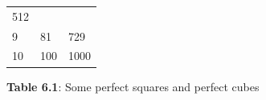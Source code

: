 {{\begin{center}
\begin{tabular}[t]{|l|l|l|}
        512%
     \tabularnewline\cline{1-1}\cline{2-2}\cline{3-3}
        9 &
        81 &
        729%
     \tabularnewline\cline{1-1}\cline{2-2}\cline{3-3}
        10 &
        100 &
        1000%
     \tabularnewline\cline{1-1}\cline{2-2}\cline{3-3}
    \end{tabular}
      \end{center}
    \begin{center}{\small\bfseries Table 6.1}: Some perfect squares and perfect cubes\end{center}
          }{ %
        \begin{center}
      \label{m38347*uid1}
    \noindent
      \tablelasttail{}
      \begin{xtabular}[t]{|l|l|l|}\hline

\end{xtabular}
\end{center}}}

